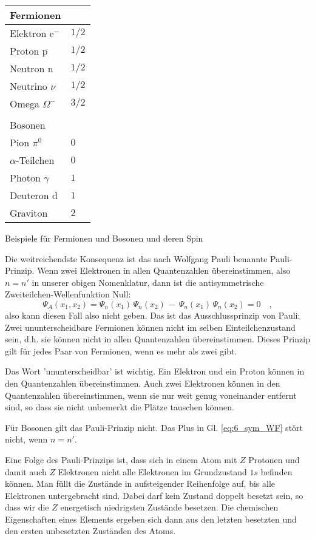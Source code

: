 \begin{marginfigure}
    \begin{tabular}{ll}
        Fermionen & \\
        \hline
        Elektron e$^-$ & $1/2$ \\
        Proton p & $1/2$ \\
        Neutron n & $1/2$ \\
        Neutrino $\nu$ & $1/2$ \\
        Omega $\Omega^-$ & $3/2$ \\
    & \\
    Bosonen & \\
    \hline
    Pion $\pi^0$ & $0$ \\
    $\alpha$-Teilchen & $0$ \\
   Photon $\gamma$ & $1$ \\
   Deuteron d & $1$ \\
    Graviton & $2$ \\
    \end{tabular}
    \caption{Beispiele für  Fermionen und Bosonen und deren Spin}
\end{marginfigure}

Die weitreichendste Konsequenz ist das nach Wolfgang Pauli benannte Pauli-Prinzip. Wenn zwei Elektronen in allen Quantenzahlen übereinstimmen, also $n = n'$ in unserer obigen Nomenklatur, dann ist die antisymmetrische Zweiteilchen-Wellenfunktion Null:
\begin{equation}
    \Psi_A(x_1, x_2) =  \Psi_{n}(x_1) \, \Psi_{n}(x_2) \, - \, \Psi_{n}(x_1) \, \Psi_{n}(x_2) = 0 \quad ,
\end{equation}
also kann  diesen Fall also nicht geben. Das ist das Ausschlussprinzip von Pauli: Zwei ununterscheidbare Fermionen können nicht im selben Einteilchenzustand sein, d.h. sie können nicht in allen Quantenzahlen übereinstimmen. Dieses Prinzip gilt für jedes Paar von Fermionen, wenn es mehr als zwei gibt.

Das Wort 'ununterscheidbar' ist wichtig. Ein Elektron und ein Proton können in den Quantenzahlen übereinstimmen. Auch zwei Elektronen können in den Quantenzahlen übereinstimmen, wenn sie nur weit genug voneinander entfernt sind, so dass sie nicht unbemerkt die Plätze tauschen können. 

Für Bosonen gilt das Pauli-Prinzip nicht. Das Plus in Gl. \ref{eq:6_sym_WF} stört nicht, wenn $n = n'$.

Eine Folge des Pauli-Prinzips ist, dass sich in einem Atom mit $Z$ Protonen und damit auch $Z$ Elektronen nicht alle Elektronen im Grundzustand $1s$ befinden können. Man füllt die Zustände in aufsteigender Reihenfolge auf, bis alle Elektronen untergebracht sind. Dabei darf kein Zustand doppelt besetzt sein, so dass wir die $Z$ energetisch niedrigsten Zustände besetzen. Die chemischen Eigenschaften eines Elements ergeben sich dann aus den letzten besetzten und den ersten unbesetzten Zuständen des Atoms.


